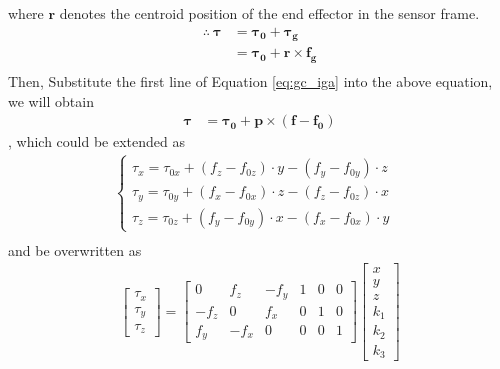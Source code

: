 where $\boldsymbol{r}$ denotes the centroid position of the end effector in the sensor frame.
\begin{equation}
\begin{split}
\therefore\ 
\boldsymbol{\tau}		&= \boldsymbol{\tau_0}	+\boldsymbol{\tau_g}\\
						&= \boldsymbol{\tau_0}	+
						   \boldsymbol{r} \times \boldsymbol{f_g}\\
\end{split}
\end{equation}
Then, Substitute the first line of Equation \ref{eq:gc_iga} into the above equation, we will obtain
\begin{equation}
\begin{split}
\boldsymbol{\tau}	&=  \boldsymbol{\tau_0}+ 
						\boldsymbol{p}	\times \left( \boldsymbol{f} - \boldsymbol{f_0} \right) 
\end{split}
\end{equation}
, which could be extended as
\begin{equation}
\begin{split}
\left\{\begin{matrix}
\tau _{x}	=	\tau _{0x} 	+ \left( f_z - f_{0z}\right) \cdot y - \left( f_y - f_{0y}\right) \cdot z\\
\tau _{y}	=	\tau _{0y}	+ \left( f_x - f_{0x}\right) \cdot z - \left( f_z - f_{0z}\right) \cdot x\\
\tau _{z}	=	\tau _{0z}	+ \left( f_y - f_{0y}\right) \cdot x - \left( f_x - f_{0x}\right) \cdot y& 
\end{matrix}\right.	\\
\end{split}
\end{equation}
and be overwritten as
\begin{equation}\label{eq:matrix_mfrk}
\begin{split}
\begin{bmatrix}
\tau _x\\
\tau _y\\
\tau _z
\end{bmatrix}
=
\begin{bmatrix}
0		&f_z	&-f_y	&1	&0	&0\\
-f_z	&0		&f_x	&0	&1	&0\\
f_y		&-f_x	&0		&0	&0	&1
\end{bmatrix}
\begin{bmatrix}
x\\
y\\
z\\
k_1\\
k_2\\
k_3
\end{bmatrix}\\
\end{split}
\end{equation}

